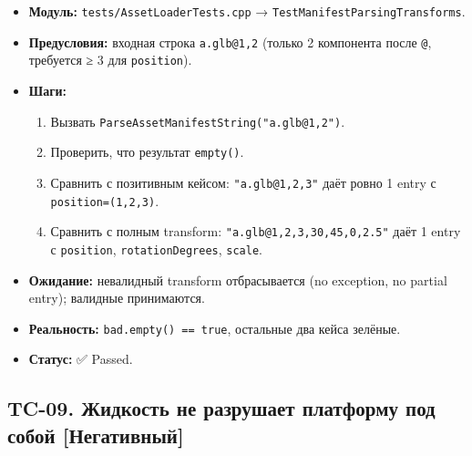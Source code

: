 \begin{itemize}
\tightlist
\item
  \textbf{Модуль:} \texttt{tests/AssetLoaderTests.cpp} → \texttt{TestManifestParsingTransforms}.
\item
  \textbf{Предусловия:} входная строка \texttt{a.glb@1,2} (только 2 компонента после \texttt{@}, требуется ≥ 3 для \texttt{position}).
\item
  \textbf{Шаги:}

  \begin{enumerate}
  \def\labelenumi{\arabic{enumi}.}
  \tightlist
  \item
    Вызвать \texttt{ParseAssetManifestString("a.glb@1,2")}.
  \item
    Проверить, что результат \texttt{empty()}.
  \item
    Сравнить с позитивным кейсом: \texttt{"a.glb@1,2,3"} даёт ровно 1 entry с \texttt{position=(1,2,3)}.
  \item
    Сравнить с полным transform: \texttt{"a.glb@1,2,3,30,45,0,2.5"} даёт 1 entry с \texttt{position}, \texttt{rotationDegrees}, \texttt{scale}.
  \end{enumerate}
\item
  \textbf{Ожидание:} невалидный transform отбрасывается (no exception, no partial entry); валидные принимаются.
\item
  \textbf{Реальность:} \texttt{bad.empty()\ ==\ true}, остальные два кейса зелёные.
\item
  \textbf{Статус:} ✅ Passed.
\end{itemize}

\subsection{TC-09. Жидкость не разрушает платформу под собой {[}Негативный{]}}\label{KT-2.2_Test_Report-tc-09-ux436ux438ux434ux43aux43eux441ux442ux44c-ux43dux435-ux440ux430ux437ux440ux443ux448ux430ux435ux442-ux43fux43bux430ux442ux444ux43eux440ux43cux443-ux43fux43eux434-ux441ux43eux431ux43eux439-ux43dux435ux433ux430ux442ux438ux432ux43dux44bux439}

